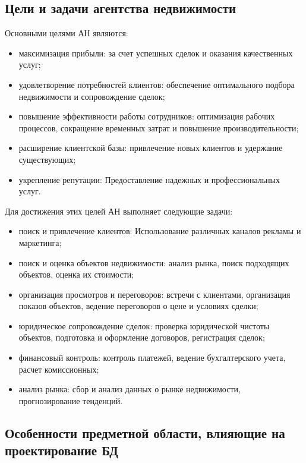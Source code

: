 \subsection{Цели и задачи агентства недвижимости}

Основными целями АН являются:
\begin{itemize}
\item максимизация прибыли: за счет успешных сделок и оказания качественных услуг;

\item удовлетворение потребностей клиентов: обеспечение оптимального подбора недвижимости и сопровождение сделок;

\item повышение эффективности работы сотрудников: оптимизация рабочих процессов, сокращение временных затрат и повышение производительности;

\item	расширение клиентской базы: привлечение новых клиентов и удержание существующих;

\item	укрепление репутации: Предоставление надежных и профессиональных услуг.
\end{itemize}
Для достижения этих целей АН выполняет следующие задачи:
\begin{itemize}
\item	поиск и привлечение клиентов: Использование различных каналов рекламы и маркетинга;

\item поиск и оценка объектов недвижимости: анализ рынка, поиск подходящих объектов, оценка их стоимости;

\item организация просмотров и переговоров: встречи с клиентами, организация показов объектов, ведение переговоров о цене и условиях сделки;

\item юридическое сопровождение сделок: проверка юридической чистоты объектов, подготовка и оформление договоров, регистрация сделок;

\item	финансовый контроль: контроль платежей, ведение бухгалтерского учета, расчет комиссионных;

\item	анализ рынка: сбор и анализ данных о рынке недвижимости, прогнозирование тенденций.
\end{itemize}

\subsection{Особенности предметной области, влияющие на проектирование БД}

